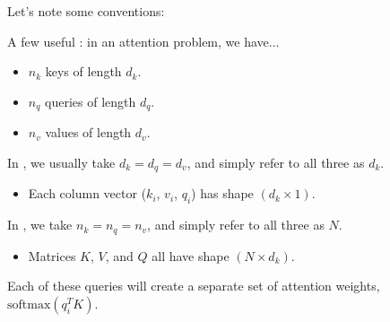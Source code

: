         Let's note some conventions:\\

        \begin{notation}
            A few useful : in an attention problem, we have...

            \begin{itemize}
                \item $n_k$ keys of length $d_k$.
                \item $n_q$ queries of length $d_q$.
                \item $n_v$ values of length $d_v$.
            \end{itemize}

            In , we usually take $d_k=d_q=d_v$, and simply refer to all three as $d_k$.

            \begin{itemize}
                \item Each column vector ($k_i$, $v_i$, $q_i$) has shape $(d_k \times 1)$.
            \end{itemize}

            In , we take $n_k=n_q=n_v$, and simply refer to all three as $N$.

                \begin{itemize}
                    \item Matrices $K$, $V$, and $Q$ all have shape $(N \times d_k)$.
                \end{itemize}
        \end{notation}

        Each of these queries will create a separate set of attention weights, $\text{softmax}(q_i^TK)$.\\

        

